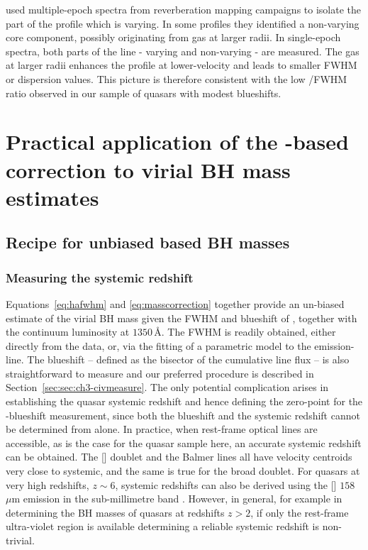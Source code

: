 \citet{denney12} used multiple-epoch spectra from reverberation mapping campaigns to isolate the part of the  profile which is varying.
In some profiles they identified a non-varying core component, possibly originating from gas at larger radii. 
In single-epoch spectra, both parts of the line - varying and non-varying - are measured. 
The gas at larger radii enhances the profile at lower-velocity and leads to smaller FWHM or dispersion values.
This picture is therefore consistent with the low /\ha FWHM ratio observed in our sample of quasars with modest  blueshifts. 

\section{Practical application of the -based correction to virial BH mass estimates}
\label{sec:ch3-application}

\subsection{Recipe for unbiased  based BH masses}
\label{sec:ch3-recipe}

\subsubsection{Measuring the systemic redshift}

Equations~\ref{eq:hafwhm} and \ref{eq:masscorrection} together provide an un-biased estimate of the virial BH mass given the FWHM and blueshift of , together with the continuum luminosity at $1350$\,\AA. 
The FWHM is readily obtained, either directly from the data, or, via the fitting of a parametric model to the  emission-line. 
The blueshift -- defined as the bisector of the cumulative line flux -- is also straightforward to measure and our preferred procedure is described in Section~\ref{sec:sec:ch3-civmeasure}.
The only potential complication arises in establishing the quasar systemic redshift and hence defining the zero-point for the -blueshift measurement, since both the blueshift and the systemic redshift cannot be determined from  alone. 
In practice, when rest-frame optical lines are accessible, as is the case for the quasar sample here, an accurate systemic redshift can be obtained. 
The [] doublet and the Balmer lines all have velocity centroids very close to systemic, and the same is true for the broad  doublet. 
For quasars at very high redshifts, $z\sim6$, systemic redshifts can also be derived using the [] $158$ $\mu$m emission in the sub-millimetre band \citep[e.g.][]{venemans16}. 
However, in general, for example in determining the BH masses of quasars at redshifts $z>2$, if only the rest-frame ultra-violet region is available determining a reliable systemic redshift is non-trivial. 

